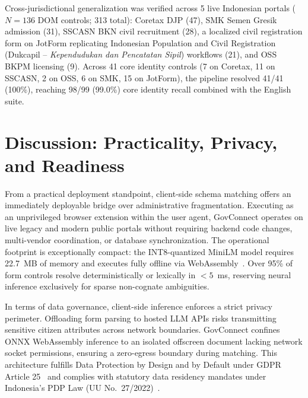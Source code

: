 \documentclass[11pt,runningheads,a4paper]{llncs}
\begin{document}
Cross-jurisdictional generalization was verified across 5 live Indonesian portals ($N = 136$ DOM controls; 313 total): Coretax DJP (47), SMK Semen Gresik admission (31), SSCASN BKN civil recruitment (28), a localized civil registration form on JotForm replicating Indonesian Population and Civil Registration (Dukcapil -- \emph{Kependudukan dan Pencatatan Sipil}) workflows (21), and OSS BKPM licensing (9). Across 41 core identity controls (7 on Coretax, 11 on SSCASN, 2 on OSS, 6 on SMK, 15 on JotForm), the pipeline resolved 41/41 (100\%), reaching 98/99 (99.0\%) core identity recall combined with the English suite.

\section{Discussion: Practicality, Privacy, and Readiness}
From a practical deployment standpoint, client-side schema matching offers an immediately deployable bridge over administrative fragmentation. Executing as an unprivileged browser extension within the user agent, GovConnect operates on live legacy and modern public portals without requiring backend code changes, multi-vendor coordination, or database synchronization. The operational footprint is exceptionally compact: the INT8-quantized MiniLM model requires 22.7~MB of memory and executes fully offline via WebAssembly~\cite{onnxweb,transformersjs}. Over 95\% of form controls resolve deterministically or lexically in $<5$~ms, reserving neural inference exclusively for sparse non-cognate ambiguities.

In terms of data governance, client-side inference enforces a strict privacy perimeter. Offloading form parsing to hosted LLM APIs risks transmitting sensitive citizen attributes across network boundaries. GovConnect confines ONNX WebAssembly inference to an isolated offscreen document lacking network socket permissions, ensuring a zero-egress boundary during matching. This architecture fulfills Data Protection by Design and by Default under GDPR Article 25~\cite{gdpr} and complies with statutory data residency mandates under Indonesia's PDP Law (UU No.~27/2022)~\cite{uupdp}.
\end{document}
